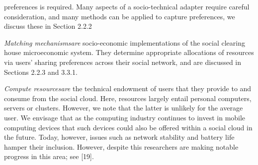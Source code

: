 \documentclass[a4paper,12pt]{article}
\begin{document}
preferences is required. Many aspects of a socio-technical
adapter require careful consideration, and many methods
can be applied to capture preferences, we discuss these in
Section 2.2.2
	\par \textit{Matching mechanismsare} socio-economic implementations of the social clearing house microeconomic system.
They determine appropriate allocations of resources via
users’ sharing preferences across their social network, and
are discussed in Sections 2.2.3 and 3.3.1.
	\par \textit{Compute resourcesare} the technical endowment of users
that they provide to and consume from the social cloud.
Here, resources largely entail personal computers, servers or
clusters. However, we note that the latter is unlikely for the
average user. We envisage that as the computing industry
continues to invest in mobile computing devices that such
devices could also be offered within a social cloud in the
future. Today, however, issues such as network stability and
battery life hamper their inclusion. However, despite this
researchers are making notable progress in this area; see [19].
\end{document}
